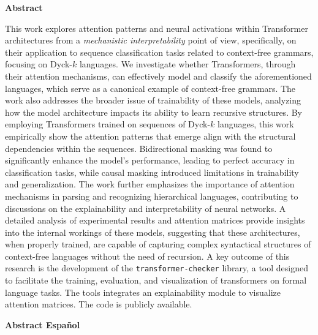 {\huge\bfseries \space Abstract}
\bigskip

This work explores attention patterns and neural activations within Transformer architectures from a \emph{mechanistic interpretability} point of view, specifically, on their application to sequence classification tasks related to context-free grammars, focusing on Dyck-$k$ languages. We investigate whether Transformers, through their attention mechanisms, can effectively model and classify the aforementioned languages, which serve as a canonical example of context-free grammars. The work also addresses the broader issue of trainability of these models, analyzing how the model architecture impacts its ability to learn recursive structures. By employing Transformers trained on sequences of Dyck-$k$ languages, this work empirically show the attention patterns that emerge align with the structural dependencies within the sequences. Bidirectional masking was found to significantly enhance the model’s performance, leading to perfect accuracy in classification tasks, while causal masking introduced limitations in trainability and generalization. The work further emphasizes the importance of attention mechanisms in parsing and recognizing hierarchical languages, contributing to discussions on the explainability and interpretability of neural networks. A detailed analysis of experimental results and attention matrices provide insights into the internal workings of these models, suggesting that these architectures, when properly trained, are capable of capturing complex syntactical structures of context-free languages without the need of recursion. A key outcome of this research is the development of the \verb|transformer-checker| library, a tool designed to facilitate the training, evaluation, and visualization of transformers on formal language tasks. The tools integrates an explainability module to visualize attention matrices. The code is publicly available.


\bigskip
\bigskip
\bigskip

{\huge\bfseries \space Abstract Español}
\bigskip



